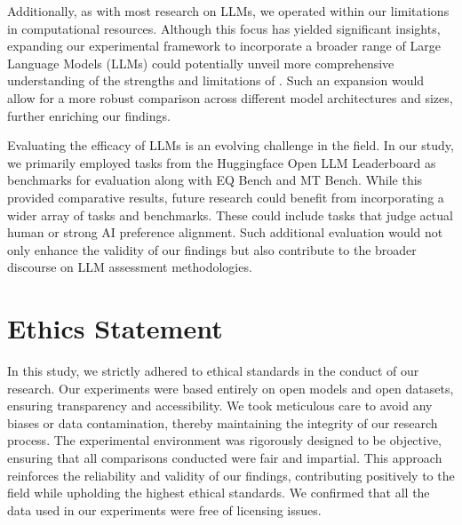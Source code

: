 Additionally, as with most research on LLMs, we operated within our limitations in computational resources. Although this focus has yielded significant insights, expanding our experimental framework to incorporate a broader range of Large Language Models (LLMs) could potentially unveil more comprehensive understanding of the strengths and limitations of \method. Such an expansion would allow for a more robust comparison across different model architectures and sizes, further enriching our findings.

Evaluating the efficacy of LLMs is an evolving challenge in the field. In our study, we primarily employed tasks from the Huggingface Open LLM Leaderboard as benchmarks for evaluation along with EQ Bench and MT Bench. While this provided comparative results, future research could benefit from incorporating a wider array of tasks and benchmarks. These could include tasks that judge actual human or strong AI preference alignment. Such additional evaluation would not only enhance the validity of our findings but also contribute to the broader discourse on LLM assessment methodologies.

\section*{Ethics Statement}
In this study, we strictly adhered to ethical standards in the conduct of our research. Our experiments were based entirely on open models and open datasets, ensuring transparency and accessibility. We took meticulous care to avoid any biases or data contamination, thereby maintaining the integrity of our research process. The experimental environment was rigorously designed to be objective, ensuring that all comparisons conducted were fair and impartial. This approach reinforces the reliability and validity of our findings, contributing positively to the field while upholding the highest ethical standards. We confirmed that all the data used in our experiments were free of licensing issues.

